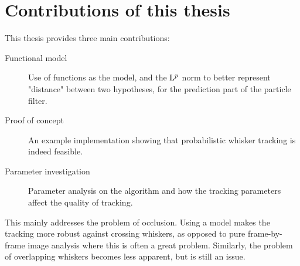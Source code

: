 \section{Contributions of this thesis}
This thesis provides three main contributions:
\begin{description}
\item[Functional model] Use of functions as the model, and the $\mathrm{L}^{p}$
  norm to better represent "distance" between two hypotheses, for the
  prediction part of the particle filter.
\item[Proof of concept] An example implementation showing that
  probabilistic whisker tracking is indeed feasible.
\item[Parameter investigation] Parameter analysis on the algorithm and
  how the tracking parameters affect the quality of tracking.
\end{description}

This mainly addresses the problem of occlusion. Using a model makes
the tracking more robust against crossing whiskers, as opposed to pure
frame-by-frame image analysis where this is often a great
problem. Similarly, the problem of overlapping whiskers becomes less
apparent, but is still an issue.
